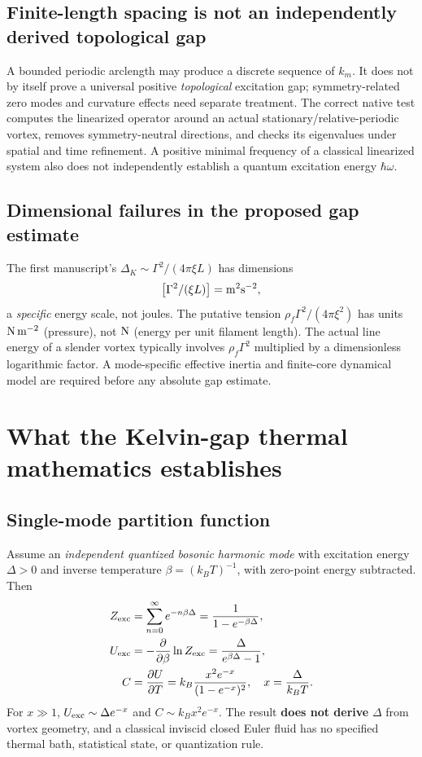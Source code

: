 \documentclass[10pt,a4paper]{article}
\newcommand{\vf}{\rho_{\!f}}
\begin{document}
\subsection{Finite-length spacing is not an independently derived topological gap}
A bounded periodic arclength may produce a discrete sequence of $k_m$. It does not by itself prove a universal positive \emph{topological} excitation gap; symmetry-related zero modes and curvature effects need separate treatment. The correct native test computes the linearized operator around an actual stationary/relative-periodic vortex, removes symmetry-neutral directions, and checks its eigenvalues under spatial and time refinement. A positive minimal frequency of a classical linearized system also does not independently establish a quantum excitation energy $\hbar\omega$.

\subsection{Dimensional failures in the proposed gap estimate}
The first manuscript's $\Delta_K\sim\Gamma^2/(4\pi\xi L)$ has dimensions
\[
\left[\Gamma^2/(\xi L)\right]={\rm m^2s^{-2}},
\]
a \emph{specific} energy scale, not joules. The putative tension $\vf\Gamma^2/(4\pi\xi^2)$ has units ${\rm N\,m^{-2}}$ (pressure), not ${\rm N}$ (energy per unit filament length). The actual line energy of a slender vortex typically involves $\vf\Gamma^2$ multiplied by a dimensionless logarithmic factor. A mode-specific effective inertia and finite-core dynamical model are required before any absolute gap estimate.

\section{What the Kelvin-gap thermal mathematics establishes}
\subsection{Single-mode partition function}
Assume an \emph{independent quantized bosonic harmonic mode} with excitation energy $\Delta>0$ and inverse temperature $\beta=(k_B T)^{-1}$, with zero-point energy subtracted. Then \cite{Pathria2011}
\begin{align}
Z_{\rm exc}&=\sum_{n=0}^{\infty}e^{-n\beta\Delta}=\frac{1}{1-e^{-\beta\Delta}},\\
U_{\rm exc}&=-\frac{\partial}{\partial\beta}\ln Z_{\rm exc}=\frac{\Delta}{e^{\beta\Delta}-1},\\
C&=\frac{\partial U}{\partial T}=k_B\frac{x^2e^{-x}}{(1-e^{-x})^2},\quad x=\frac{\Delta}{k_BT}.
\end{align}
For $x\gg1$, $U_{\rm exc}\sim\Delta e^{-x}$ and $C\sim k_B x^2e^{-x}$. The result \textbf{does not derive} $\Delta$ from vortex geometry, and a classical inviscid closed Euler fluid has no specified thermal bath, statistical state, or quantization rule.
\end{document}
